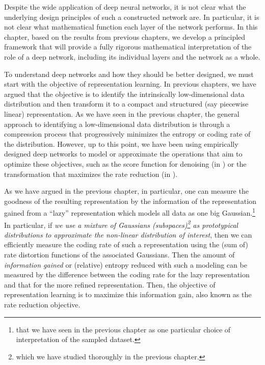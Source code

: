 \documentclass[../../book-main.tex]{subfiles}
\begin{document}
Despite the wide application of deep neural networks, it is not clear
what the underlying design principles of such a constructed network
are. In particular, it is not clear what mathematical function each
layer of the network performs. In this chapter, based on the results
from previous chapters, we develop a principled framework that will
provide a fully rigorous mathematical interpretation of the role of a
deep network, including its individual layers and the network as a whole.

To understand deep networks and how they should be better designed,
we must start with the objective of representation learning. In
previous chapters, we have argued that the objective is to identify
the intrinsically low-dimensional data distribution and then
transform it to a compact and structured (say piecewise linear)
representation. As we have seen in the previous chapter, the general
approach to identifying a low-dimensional data distribution is
through a compression process that progressively minimizes the
entropy or coding rate of the distribution. However, up to this
point, we have been using empirically designed deep networks to model
or approximate the operations that aim to optimize these objectives,
such as the score function for denoising (in
) or the transformation that maximizes the
rate reduction (in ).

As we have argued in the previous chapter,
 in particular, one
can measure the goodness of the resulting representation by the
information of the representation gained from a ``lazy''
representation which models all data as one big
Gaussian.\footnote{that we have seen in the previous chapter as one
particular choice of interpretation of the sampled dataset.} In
particular, if \textit{we use a mixture of Gaussians
    (subspaces)\footnote{which we have studied thoroughly in the previous
    chapter.} as prototypical distributions to approximate the non-linear
distribution of interest}, then we can efficiently measure the coding
rate of such a representation using the (sum of) rate distortion
functions of the associated Gaussians. Then the amount of {\em
information gained} or (relative) entropy reduced with such a
modeling can be measured by the difference between the coding rate
for the lazy representation and that for the more refined
representation. Then,  the objective of representation learning is to
maximize this information gain, also known as the rate reduction objective.
\end{document}
